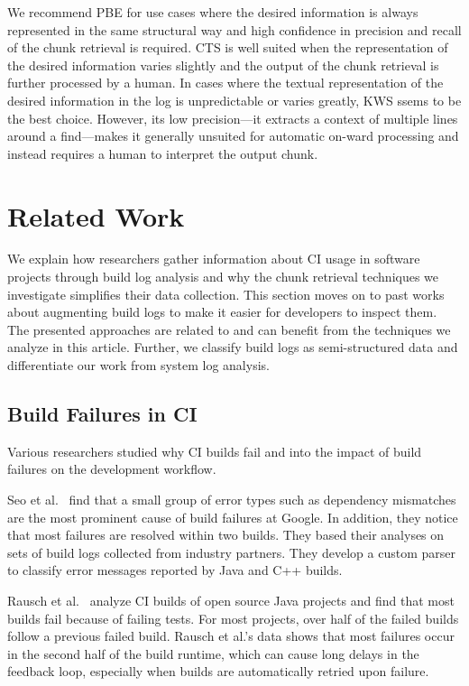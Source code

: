 We recommend PBE for use cases where the desired information is always
represented in the same structural way and high confidence in precision and
recall of the chunk retrieval is required.
CTS is well suited when the representation of the desired information varies
slightly and the output of the chunk retrieval is further processed by a human.
In cases where the textual representation of the desired information in the log
is unpredictable or varies greatly, KWS ssems to be the best choice. However, its low precision---it extracts a context of multiple lines around a find---makes it generally unsuited for automatic on-ward processing and instead requires a human to interpret the output chunk.


\section{Related Work}
\label{sec:rw}
We explain how researchers gather information about CI usage in software projects
through build log analysis and why the chunk retrieval techniques we investigate
simplifies their data collection.
This section moves on to past works about augmenting build logs to make it easier
for developers to inspect them.
The presented approaches are related to and can benefit from the techniques we
analyze in this article.
Further, we classify build logs as semi-structured data and differentiate our
work from system log analysis.

\subsection{Build Failures in CI}
Various researchers studied why CI builds fail and into the impact of build failures on the development workflow.

Seo et al.~\cite{seo2014programmers} find that a small group of error types such as dependency mismatches are the most prominent cause of build failures at Google.
In addition, they notice that most failures are resolved within two builds.
They based their analyses on sets of build logs collected from industry partners.
They develop a custom parser to classify error messages reported by Java and C++ builds.

Rausch et al.~\cite{rausch2017empirical} analyze CI builds of open source Java projects and find that most builds fail because of failing tests.
For most projects, over half of the failed builds follow a previous failed build.
Rausch et al.'s data shows that most failures occur in the second half of the build runtime, which can cause long delays in the feedback loop, especially when builds are automatically retried upon failure.

